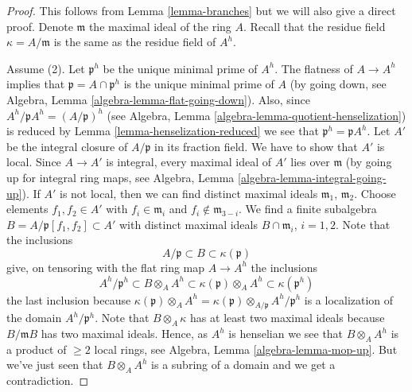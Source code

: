 \documentclass[10pt,a4paper]{amsart}
\theoremstyle{plain}
\theoremstyle{definition}
\theoremstyle{remark}
\numberwithin{equation}{subsection}
\begin{document}
\begin{proof}
This follows from Lemma \ref{lemma-branches} but we will also give a
direct proof. Denote $\mathfrak m$ the maximal ideal of the ring $A$.
Recall that the residue field $\kappa = A/\mathfrak m$ is the same as
the residue field of $A^h$.

\medskip\noindent
Assume (2). Let $\mathfrak p^h$ be the unique minimal prime of
$A^h$. The flatness of $A \to A^h$ implies that
$\mathfrak p = A \cap \mathfrak p^h$ is the unique minimal
prime of $A$ (by going down, see
Algebra, Lemma \ref{algebra-lemma-flat-going-down}).
Also, since $A^h/\mathfrak pA^h = (A/\mathfrak p)^h$ (see
Algebra, Lemma \ref{algebra-lemma-quotient-henselization})
is reduced by Lemma \ref{lemma-henselization-reduced}
we see that $\mathfrak p^h = \mathfrak pA^h$.
Let $A'$ be the integral closure of $A/\mathfrak p$ in its fraction
field. We have to show that $A'$ is local.
Since $A \to A'$ is integral, every maximal ideal of $A'$ lies over
$\mathfrak m$ (by going up for integral ring maps, see
Algebra, Lemma \ref{algebra-lemma-integral-going-up}).
If $A'$ is not local, then we can find distinct maximal ideals
$\mathfrak m_1$, $\mathfrak m_2$. Choose elements $f_1, f_2 \in A'$
with $f_i \in \mathfrak m_i$ and $f_i \not \in \mathfrak m_{3 - i}$.
We find a finite subalgebra $B = A/\mathfrak p[f_1, f_2] \subset A'$
with distinct maximal ideals $B \cap \mathfrak m_i$, $i = 1, 2$.
Note that the inclusions
$$
A/\mathfrak p \subset B \subset \kappa(\mathfrak p)
$$
give, on tensoring with the flat ring map $A \to A^h$ the inclusions
$$
A^h/\mathfrak p^h \subset
B \otimes_A A^h \subset
\kappa(\mathfrak p) \otimes_A A^h \subset
\kappa(\mathfrak p^h)
$$
the last inclusion because
$\kappa(\mathfrak p) \otimes_A A^h =
\kappa(\mathfrak p) \otimes_{A/\mathfrak p} A^h/\mathfrak p^h$
is a localization of the domain $A^h/\mathfrak p^h$.
Note that $B \otimes_A \kappa$ has at least two maximal ideals
because $B/\mathfrak mB$ has two maximal ideals. Hence, as
$A^h$ is henselian we see that
$B \otimes_A A^h$ is a product of $\geq 2$ local rings, see
Algebra, Lemma \ref{algebra-lemma-mop-up}.
But we've just seen that $B \otimes_A A^h$ is a subring of a domain
and we get a contradiction.


\end{proof}
\end{document}
